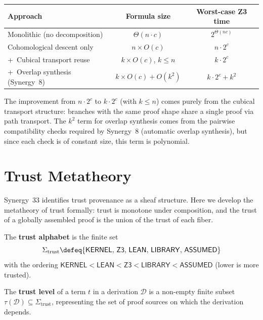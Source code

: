 \begin{center}
\renewcommand{\arraystretch}{1.4}
\begin{tabular}{p{5.5cm}cc}
\toprule
\textbf{Approach} & \textbf{Formula size} & \textbf{Worst-case Z3 time} \\
\midrule
Monolithic (no decomposition) & $\Theta(n \cdot c)$ & $2^{\Theta(nc)}$ \\
Cohomological descent only & $n \times O(c)$ & $n \cdot 2^c$ \\
+\ Cubical transport reuse & $k \times O(c)$, $k \leq n$ & $k \cdot 2^c$ \\
+\ Overlap synthesis (Synergy~8) & $k \times O(c) + O(k^2)$ & $k \cdot 2^c + k^2$ \\
\bottomrule
\end{tabular}
\end{center}

\begin{remark}
The improvement from $n \cdot 2^c$ to $k \cdot 2^c$ (with $k \leq n$)
comes purely from the cubical transport structure: branches with the same
proof shape share a single proof via path transport.  The $k^2$ term
for overlap synthesis comes from the pairwise compatibility checks
required by Synergy~8 (automatic overlap synthesis), but since each
check is of constant size, this term is polynomial.
\end{remark}


\section{Trust Metatheory}
\label{sec:trust-metatheory}

Synergy~33 identifies trust provenance as a sheaf structure.  Here we
develop the metatheory of trust formally: trust is monotone under
composition, and the trust of a globally assembled proof is the union of
the trust of each fiber.

\begin{definition}
\label{def:trust-provenance}
The \textbf{trust alphabet} is the finite set
\[
  \Sigma_{\mathrm{trust}} \defeq
  \{\mathsf{KERNEL},\, \mathsf{Z3},\, \mathsf{LEAN},\,
    \mathsf{LIBRARY},\, \mathsf{ASSUMED}\}
\]
with the ordering $\mathsf{KERNEL} < \mathsf{LEAN} < \mathsf{Z3} <
\mathsf{LIBRARY} < \mathsf{ASSUMED}$ (lower is more trusted).

The \textbf{trust level} of a term $t$ in a derivation $\mathcal{D}$ is
a non-empty finite subset
$\tau(\mathcal{D}) \subseteq \Sigma_{\mathrm{trust}}$,
representing the set of proof sources on which the derivation depends.
\end{definition}

